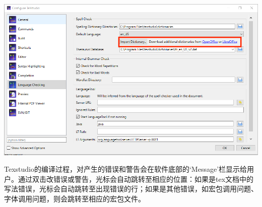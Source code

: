 \documentclass[12pt]{book}
\begin{document}
\begin{center}
	\includegraphics[width=0.8\linewidth]{./lang-check.png}
\end{center}
Texstudio的编译过程，对产生的错误和警告会在软件底部的`Message’栏显示给用户。通过双击改错误或警告，光标会自动跳转至相应的位置：如果是tex文档中的写法错误，光标会自动跳转至出现错误的行；如果是其他错误，如宏包调用问题、字体调用问题，则会跳转至相应的宏包文件。
\end{document}
